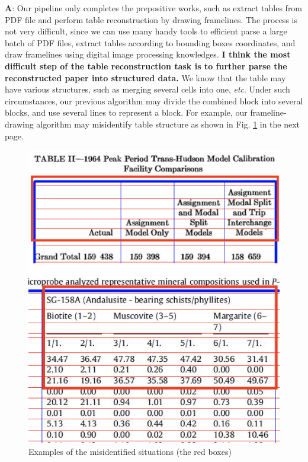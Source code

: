 \documentclass[12pt, a4paper]{article}
\theoremstyle{definition}
\begin{document}
\begin{enumerate}
	\textbf{A}: Our pipeline only completes the prepositive works, such as extract tables from PDF file and perform table reconstruction by drawing framelines. The process is not very difficult, since we can use many handy tools to efficient parse a large batch of PDF files, extract tables according to bounding boxes coordinates, and draw framelines using digital image processing knowledges. \textbf{I think the most difficult step of the table reconstruction task is to further parse the reconstructed paper into structured data.} We know that the table may have various structures, such as merging several cells into one, \textit{etc}. Under such circumstances, our previous algorithm may divide the combined block into several blocks, and use several lines to represent a block. For example, our frameline-drawing algorithm may misidentify table structure as shown in Fig. \ref{fig6} in the next page.
	\begin{figure}[htbp]
		\centering
			\begin{minipage}[t]{0.4\linewidth}
			\centering
			\includegraphics[width=\linewidth]{wrong1.png}
			\end{minipage}
			\begin{minipage}[t]{0.4\linewidth}
			\centering
			\includegraphics[width=\linewidth]{wrong2.png}
			\end{minipage}
		\caption{Examples of the misidentified situations (the red boxes)}
		\label{fig6}
	\end{figure}
	

\end{enumerate}
\end{document}
